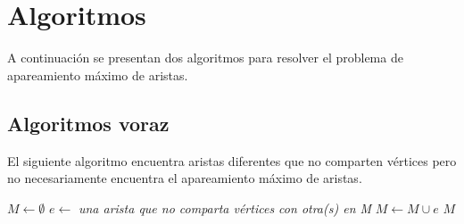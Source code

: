 \documentclass[12pt,a4paper]{article}
\begin{document}
\section{Algoritmos} \noindent 
A continuación se presentan dos algoritmos para resolver el problema de apareamiento máximo de aristas.

\subsection{Algoritmos voraz}
El siguiente algoritmo encuentra aristas diferentes que no comparten vértices pero no necesariamente encuentra el apareamiento máximo de aristas.

\begin{center}
	\begin{algorithmic}[1]
		\STATE $M\gets \emptyset$
			\STATE $e\gets$ \textit{una arista que no comparta vértices con otra(s) en M}
    		\STATE $M\gets M \cup e$
		\ENDWHILE
		\RETURN $M$
	\end{algorithmic}
\end{center}
\end{document}
